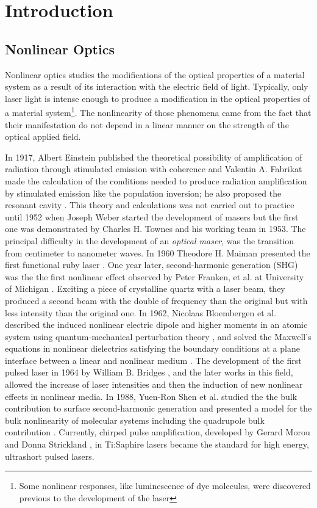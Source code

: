 \chapter{Introduction}\label{chap:introduction}
\partialtoc

\section{Nonlinear Optics}
\label{sec:nonlinear_optics}

Nonlinear optics studies the modifications of the optical properties of a
material system as a result of its interaction with the electric field of
light. Typically, only laser light is intense enough to produce a modification
in the optical properties of a material system\footnote{Some nonlinear
responses, like luminescence of dye molecules, were discovered previous to the
development of the laser}.
% 
The nonlinearity of those phenomena came from the fact that their manifestation
do not depend in a linear manner on the strength of the optical applied field.

In 1917, Albert Einstein published the theoretical possibility of amplification
of radiation through stimulated emission with coherence \cite{rawicz08PSPIE}
and Valentin A. Fabrikat made the calculation of the conditions needed to
produce radiation amplification by stimulated emission like the population
inversion; he also proposed the resonant cavity \cite{lukishova10JEOSRP}. This
theory and calculations was not carried out to practice until 1952 when Joseph
Weber started the development of masers but the first one was demonstrated by
Charles H. Townes and his working team in 1953. The principal difficulty in the
development of an \emph{optical maser}, was the transition from centimeter to
nanometer waves. In 1960 Theodore H. Maiman presented the first functional ruby
laser \cite{maiman60Nat}.
One year later, second-harmonic generation (SHG) was the the first nonlinear
effect observed by Peter Franken, et al. at University of Michigan
\cite{franken61PRL}. Exciting a piece of crystalline quartz with a laser beam,
they produced a second beam with the double of frequency than the original but
with less intensity than the original one.
% 
In 1962, Nicolaas Bloembergen et al. described the induced nonlinear electric
dipole and higher moments in an atomic system using quantum-mechanical
perturbation theory \cite{armstrong62PR}, and solved the  Maxwell's equations
in nonlinear dielectrics satisfying the boundary conditions at a plane
interface between a linear and nonlinear medium \cite{bloembergen1962PR}.
% 
The development of the first pulsed laser in 1964 by William B. Bridges
\cite{bridges1964APL}, and the later works in this field, allowed the increase
of laser intensities and then the induction of new nonlinear effects in
nonlinear media. 
% 
In 1988, Yuen-Ron Shen et al. studied the the bulk contribution to surface
second-harmonic generation and presented a model for the bulk nonlinearity of
molecular systems including the quadrupole bulk contribution \cite{guyot88PRB}.
% 
Currently, chirped pulse amplification, developed by Gerard Morou and Donna
Strickland \cite{strickland85OC}, in Ti:Saphire lasers became the standard for
high energy, ultrashort pulsed lasers.

